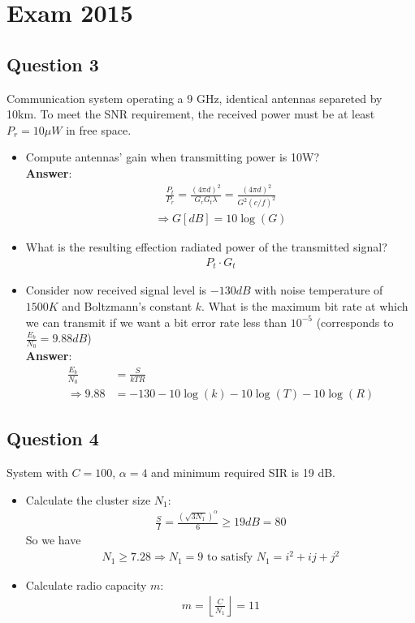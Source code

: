 
\section*{Exam 2015}

\subsection*{Question 3}
Communication system operating a 9 GHz, identical antennas separeted by 10km. To meet the SNR requirement, the received power must be at least $P_r = 10 \mu W$ in free space.

\begin{itemize}
	\item Compute antennas' gain when transmitting power is 10W? \\
	\textbf{Answer}:
	\begin{align*}
		\frac{P_t}{P_r} = \frac{(4 \pi d)^2}{G_r G_t \lambda} = \frac{(4 \pi d)^2}{G^2 (c/f)^2}
	\end{align*}
	\begin{align*}
		\Rightarrow G[dB] = 10 \log(G)
	\end{align*}
	\item What is the resulting effection radiated power of the transmitted signal?
	\begin{align*}
		P_t \cdot G_t
	\end{align*}
	\item Consider now received signal level is $-130dB$ with noise temperature of $1500K$ and Boltzmann's constant $k$. What is the maximum bit rate at which we can transmit if we want a bit error rate less than $10^{-5}$ (corresponds to $\frac{E_b}{N_0} = 9.88dB$) \\
	\textbf{Answer}:
	\begin{align*}
		\frac{E_b}{N_0}  &= \frac{S}{k T R} \\
		\Rightarrow 9.88 &= -130 - 10 \log(k) - 10\log(T) - 10 \log(R) 
	\end{align*}
\end{itemize}

\subsection*{Question 4}
System with $C = 100$, $\alpha = 4$ and minimum required SIR is 19 dB.
\begin{itemize}
	\item Calculate the cluster size $N_1$:
	\begin{align*}
		\frac{S}{I} = \frac{(\sqrt{3 N_1})^{\alpha}}{6} \geq 19dB = 80
	\end{align*}
	So we have 
	\begin{align*}
		N_1 \geq 7.28 \Rightarrow N_1 = 9 \text{ to satisfy } N_1 = i^2 + ij + j^2
	\end{align*}
	\item Calculate radio capacity $m$:
	\begin{align*}
		m = \left \lfloor \frac{C}{N_1} \right \rfloor = 11
	\end{align*}
\end{itemize}

